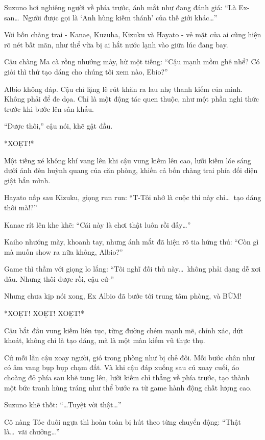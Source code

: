 \documentclass[../main.tex]{subfiles}
\begin{document}
Suzuno hơi nghiêng người về phía trước, ánh mắt như đang đánh giá: ``Là Ex-san\dots\ Người được gọi là `Anh hùng kiếm thánh' của thế giới khác\dots''

Với bốn chàng trai - Kanae, Kuzuha, Kizuku và Hayato - vẻ mặt của ai cũng hiện rõ nét bất mãn, như thể vừa bị ai hắt nước lạnh vào giữa lúc đang bay.

Cậu chàng Ma cà rồng nhướng mày, hừ một tiếng: ``Cậu mạnh mồm ghê nhể? Có giỏi thì thử tạo dáng cho chúng tôi xem nào, Ebio?''

Albio không đáp. Cậu chỉ lặng lẽ rút khăn ra lau nhẹ thanh kiếm của mình. Không phải để đe dọa. Chỉ là một động tác quen thuộc, như một phần nghi thức trước khi bước lên sân khấu.

``Được thôi,'' cậu nói, khẽ gật đầu.

*XOẸT!*


Một tiếng xé không khí vang lên khi cậu vung kiếm lên cao, lưỡi kiếm lóe sáng dưới ánh đèn huỳnh quang của căn phòng, khiến cả bốn chàng trai phía đối diện giật bắn mình.

Hayato nấp sau Kizuku, giọng run run: ``T-Tôi nhớ là cuộc thi này chỉ\dots\ tạo dáng thôi mà!?''

Kanae rít lên khe khẽ: ``Cái này là chơi thật luôn rồi đấy\dots''

Kaiho nhướng mày, khoanh tay, nhưng ánh mắt đã hiện rõ tia hứng thú: ``Còn gì mà muốn show ra nữa không, Albio?''

Game thì thầm với giọng lo lắng: ``Tôi nghĩ đối thủ này\dots\ không phải dạng dễ xơi đâu. Nhưng thôi được rồi, cậu cứ-''

Nhưng chưa kịp nói xong, Ex Albio đã bước tới trung tâm phòng, và BÙM!

*XOẸT! XOẸT! XOẸT!*

Cậu bắt đầu vung kiếm liên tục, từng đường chém mạnh mẽ, chính xác, dứt khoát, không chỉ là tạo dáng, mà là một màn kiếm vũ thực thụ.

Cứ mỗi lần cậu xoay người, gió trong phòng như bị chẻ đôi. Mỗi bước chân như có âm vang bụp bụp chạm đất. Và khi cậu đáp xuống sau cú xoay cuối, áo choàng đỏ phía sau khẽ tung lên, lưỡi kiếm chỉ thẳng về phía trước, tạo thành một bức tranh hùng tráng như thể bước ra từ game hành động chất lượng cao.


Suzuno khẽ thốt: ``\dots Tuyệt vời thật\dots''

Cô nàng Tóc đuôi ngựa thì hoàn toàn bị hút theo từng chuyển động: ``Thật là\dots\ vãi chưởng\dots''
\end{document}
